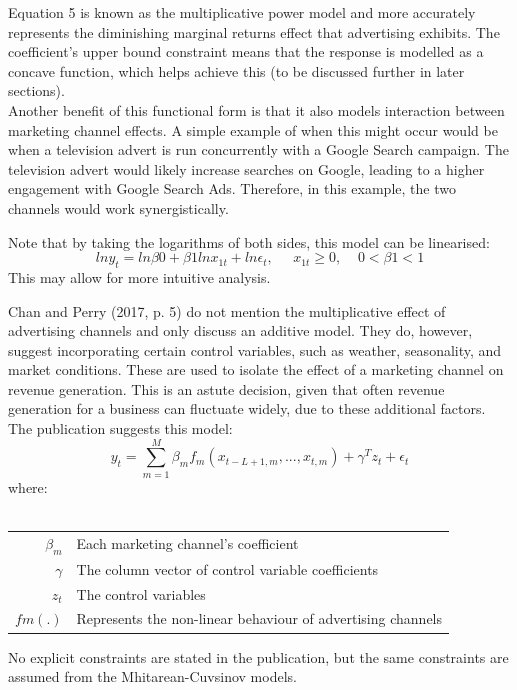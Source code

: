 \documentclass[11pt, a4paper]{article}
\begin{document}
Equation 5 is known as the multiplicative power model and more accurately represents the diminishing marginal returns effect that advertising exhibits. The coefficient’s upper bound constraint means that the response is modelled as a concave function, which helps achieve this (to be discussed further in later sections). \\

Another benefit of this functional form is that it also models interaction between marketing channel effects. A simple example of when this might occur would be when a television advert is run concurrently with a Google Search campaign. The television advert would likely increase searches on Google, leading to a higher engagement with Google Search Ads. Therefore, in this example, the two channels would work synergistically.

Note that by taking the logarithms of both sides, this model can be linearised: 
\begin{equation}
lny_{t}=ln\beta0+\beta1lnx_{1t}+ln\epsilon_{t},\;\;\;\;\;x_{1t}\geq0,\;\;\;\;0<\beta1<1
\end{equation}
This may allow for more intuitive analysis.

Chan and Perry (2017, p. 5) do not mention the multiplicative effect of advertising channels and only discuss an additive model. They do, however, suggest incorporating certain control variables, such as weather, seasonality, and market conditions. These are used to isolate the effect of a marketing channel on revenue generation. This is an astute decision, given that often revenue generation for a business can fluctuate widely, due to these additional factors. The publication suggests this model: 
\begin{equation}
    y_{t}=\sum_{m=1}^{M}
    \beta_mf_m(x_{t-L+1,m},...,x_{t,m})+\gamma^Tz_{t}+\epsilon_{t}
\end{equation}
where:\\\\
\hspace{1cm}
\begin{tabular}{r@{ : }l}
$\beta_{m}$ & Each marketing channel's coefficient\\
$\gamma$ & The column vector of control variable coefficients\\
$z_{t}$ & The control variables\\
$fm(.)$ & Represents the non-linear behaviour of advertising channels
\end{tabular}

No explicit constraints are stated in the publication, but the same constraints are assumed from the Mhitarean-Cuvsinov models.
\end{document}
